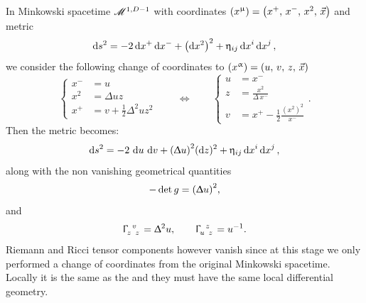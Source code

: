 In Minkowski spacetime $\mathscr{M}^{1,D-1}$ with coordinates $\qty(x^{\upmu}) = \qty(x^+,\, x^-,\, x^2,\, \vec{x})$
and metric
\begin{equation}
  \dss[2]{s}
  =
  - 2 \dd{x^+} \dd{x^-}
  + \qty(\dd{x^2})^2
  + \eta_{ij} \dd{x}^i \dd{x}^j,
\end{equation}
we consider the following change of coordinates to $\qty(x^{\upalpha}) = (u,\, v,\, z,\, \vec{x})$
\begin{equation}
  \begin{cases}
    x^- & = u
    \\
    x^2 & = \Delta u z
    \\
    x^+ & = v + \frac{1}{2} \Delta^2 u z^2
  \end{cases}
  \qquad
  \Leftrightarrow
  \qquad
  \begin{cases}
    u & = x^-
    \\
    z & = \frac{x^2}{\Delta\, x^-}
    \\
    v & = x^+ - \frac{1}{2} \frac{(x^2)^2}{x^-}
  \end{cases}.
  \label{eq:NBO_coordinates}
\end{equation}
Then the metric becomes:
\begin{equation}
  \dss[2]{s}
  =
  - 2\, \dd{u}\, \dd{v}
  + \qty(\Delta u )^2 (\dd{z})^2
  + \eta_{ij} \dd{x}^i \dd{x}^j,
\end{equation}
along with the non vanishing geometrical quantities
\begin{equation}
  -\det g = \qty( \Updelta u )^2,
\end{equation}
and
\begin{equation}
  \tensor{\Gamma}{_z^v_z} = \Delta^2 u,
  \qquad
  \tensor{\Gamma}{_u^z_z} = u^{-1}.
\end{equation}
Riemann and Ricci tensor components however vanish since at this stage we only performed a change of coordinates from the original Minkowski spacetime.
Locally it is the same as the \nbo and they must have the same local differential geometry.

